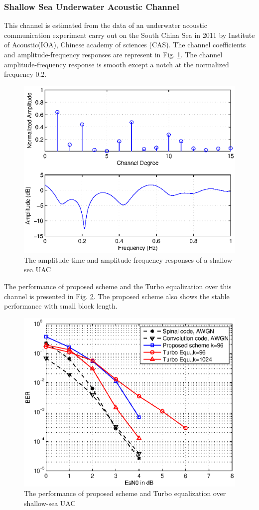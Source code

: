 \documentclass[conference]{IEEEtran}
\begin{document}
\subsubsection{Shallow Sea Underwater Acoustic Channel}
This channel is estimated from the data of an underwater acoustic communication experiment carry out on the South China Sea in 2011 by Institute of Acoustic(IOA), Chinese academy of sciences (CAS). The channel coefficients and  amplitude-frequency responses are represent in Fig. \ref{fig_ShallowChannel}. The channel amplitude-frequency response is smooth except a notch at the normalized frequency 0.2. 
\begin{figure}[!t]
\centering
\includegraphics[width=3.5 in]{ShallowChannel.eps}
\caption{The amplitude-time and amplitude-frequency responses of a shallow-sea UAC}
\label{fig_ShallowChannel}
\end{figure}
The performance of proposed scheme and the Turbo equalization over this channel is presented in Fig. \ref{fig_ShallowQPSKComparison}. The proposed scheme also shows the stable performance with small block length.
\begin{figure}[!t]
\centering
\includegraphics[width=3.5 in]{ShallowQPSKComparison.eps}
\caption{The performance of proposed scheme and Turbo equalization over shallow-sea UAC}
\label{fig_ShallowQPSKComparison}
\end{figure}
\end{document}
